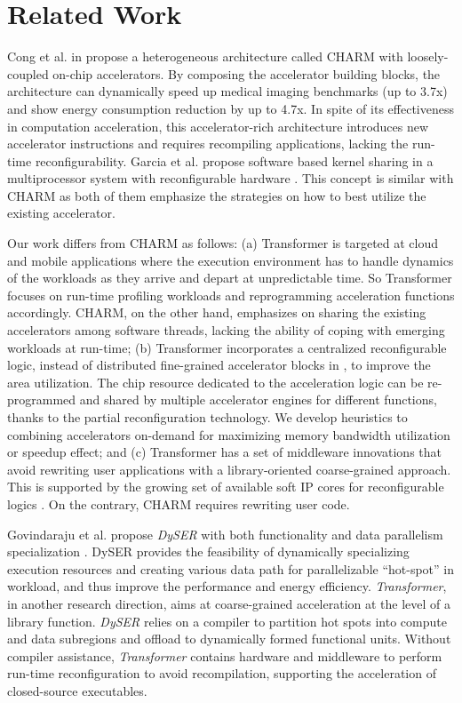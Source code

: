 \section{Related Work}
\label{sec_related}
Cong et al. in \cite{accrich,cong-islped12,cong-saw11} propose a
heterogeneous architecture called CHARM with loosely-coupled on-chip
accelerators. By composing the accelerator building blocks, the
architecture can dynamically speed up medical imaging benchmarks (up
to 3.7x) and show energy consumption reduction by up to 4.7x.  In
spite of its effectiveness in computation acceleration, this
accelerator-rich architecture introduces new accelerator instructions and
requires recompiling applications, lacking the run-time
reconfigurability.  Garcia et al. propose software based kernel sharing in a
multiprocessor system with reconfigurable hardware
	\cite{Garcia:2008iy}. This concept is similar with CHARM as both
of them emphasize the strategies on how to best utilize the existing
accelerator.

Our work differs from CHARM \cite{accrich,cong-islped12,cong-saw11} as
follows: (a) Transformer is targeted at cloud and mobile applications
where the execution environment has to handle dynamics of the
workloads as they arrive and depart at unpredictable time. So
Transformer focuses on run-time profiling workloads and reprogramming
acceleration functions accordingly. CHARM, on the other hand,
emphasizes on sharing the existing accelerators among software
threads, lacking the ability of coping with emerging workloads at
run-time; (b) Transformer incorporates a centralized reconfigurable
logic, instead of distributed fine-grained accelerator blocks in
\cite{accrich}, to improve the area utilization. The chip
resource dedicated to the acceleration logic can be re-programmed and
shared by multiple accelerator engines for different functions, thanks
to the partial reconfiguration technology.  We develop heuristics to
combining accelerators on-demand for maximizing memory bandwidth
utilization or speedup effect; and (c) Transformer has a set of
middleware innovations that avoid rewriting user applications with a
library-oriented coarse-grained approach. This is supported by the
growing set of available soft IP cores for reconfigurable logics
\cite{opencores,design-reuse,free-ip}. On the contrary, CHARM requires
rewriting user code.

Govindaraju et al. propose {\em DySER} with both functionality and
data parallelism specialization \cite{Govindaraju:2012fn,Govindaraju:HPCA11}. DySER
provides the feasibility of dynamically specializing execution
resources and creating various data path for parallelizable
``hot-spot'' in workload, and thus improve the performance and energy
efficiency. {\em Transformer}, in another research direction, aims at
coarse-grained acceleration at the level of a library function. {\em
  DySER} relies on a compiler to partition hot spots into compute and
data subregions and offload to dynamically formed functional
units. Without compiler assistance, {\em Transformer} contains
hardware and middleware to perform run-time reconfiguration to avoid
recompilation, supporting the acceleration of closed-source
executables.

